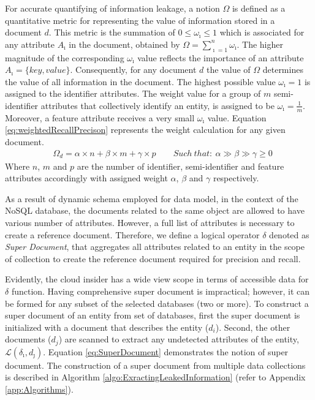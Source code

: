 \noindent For accurate quantifying of information leakage, a notion $ \Omega$ is defined as a quantitative metric for representing the value of information stored in a document $d$. This metric is the summation of $0 \leq \omega_\imath \leq 1$ which is associated for any attribute $A_\imath$ in the document, obtained by $\Omega=\sum\limits_{\imath=1}^n \omega_\imath$. The higher magnitude of the corresponding $\omega_\imath$ value reflects the importance of an attribute $A_\imath=\{key, value\}$. Consequently, for any document $d$ the value of $\Omega$ determines the value of all information in the document. The highest possible value  $\omega_\imath = 1$ is assigned to the identifier attributes. The weight value for a group of $m$ semi-identifier attributes that collectively identify an entity, is assigned to be  $\omega_\imath=\frac{1}{m}$. Moreover, a feature attribute receives a very small $\omega_\imath$ value. Equation \ref{eq:weightedRecallPrecison} represents the weight calculation for any given document.\\

\begin{equation}
\label{eq:weightedRecallPrecison}
\begin{aligned}
& \Omega_d=\alpha \times n + \beta \times m + \gamma \times p \qquad
 Such~ that:~ \alpha \gg \beta \gg \gamma \geq 0
\end{aligned}
\end{equation}
Where $n$, $m$ and $p$ are the number of identifier, semi-identifier and feature attributes accordingly with assigned weight $\alpha$, $\beta$  and $\gamma$ respectively.


As a result of dynamic schema employed for data model, in the context of the NoSQL database, the documents related to the same object are allowed to have various number of attributes. However, a full list of attributes is necessary to create a reference document. Therefore, we define a logical operator $\delta$ denoted as \emph{Super Document}, that aggregates all attributes related to an entity in the scope of collection to create the reference document required for precision and recall. 

Evidently, the cloud insider has a wide view scope in terms of accessible data for $\delta$ function. Having comprehensive super document is impractical; however, it can be formed for any subset of the selected databases (two or more). To construct a super document of an entity from set of databases, first the super document is initialized with a document that describes the entity ($d_i$). Second, the other documents ($d_j$) are scanned to extract any undetected attributes of the entity, $\mathcal{L}(\delta_{\imath},d_\jmath)$. Equation \ref{eq:SuperDocument} demonstrates the notion of super document. The construction of a super document from multiple data collections is described in Algorithm \ref{algo:ExractingLeakedInformation} (refer to Appendix \ref{app:Algorithms}).

